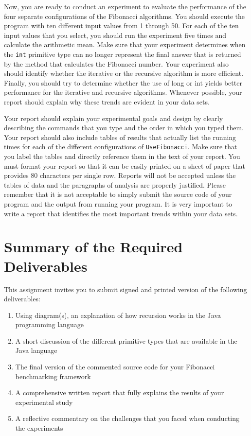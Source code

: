 Now, you are ready to conduct an experiment to evaluate the performance of the four separate configurations of the
Fibonacci algorithms. You should execute the program with ten different input values from 1 through 50. For each of the
ten input values that you select, you should run the experiment five times and calculate the arithmetic mean. Make sure
that your experiment determines when the {\tt int} primitive type can no longer represent the final answer that is
returned by the method that calculates the Fibonacci number. Your experiment also should identify whether the iterative
or the recursive algorithm is more efficient.  Finally, you should try to determine whether the use of long or int
yields better performance for the iterative and recursive algorithms. Whenever possible, your report should explain why
these trends are evident in your data sets.

Your report should explain your experimental goals and design by clearly describing the commands that you type and the
order in which you typed them. Your report should also include tables of results that actually list the running times
for each of the different configurations of {\tt UseFibonacci}.  Make sure that you label the tables and directly
reference them in the text of your report. You must format your report so that it can be easily printed on a sheet of
paper that provides 80 characters per single row. Reports will not be accepted unless the tables of data and the
paragraphs of analysis are properly justified.  Please remember that it is not acceptable to simply submit the source
code of your program and the output from running your program. It is very important to write a report that identifies
the most important trends within your data sets.

\section*{Summary of the Required Deliverables}

  This assignment invites you to submit signed and printed version of the following deliverables: 

  \begin{enumerate} 
  \itemsep0pt
  \item Using diagram(s), an explanation of how recursion works in the Java programming language

  \item A short discussion of the different primitive types that are available in the Java language

  \item The final version of the commented source code for your Fibonacci benchmarking framework

  \item A comprehensive written report that fully explains the results of your experimental study

  \item A reflective commentary on the challenges that you faced when conducting the experiments
   
  \end{enumerate}

